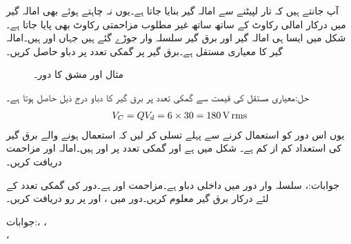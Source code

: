 آپ جانتے ہیں کہ تار لپیٹنے سے امالہ گیر بنایا جاتا ہے۔یوں نہ چاہتے ہوئے بھی امالہ گیر میں درکار امالی رکاوٹ کے ساتھ ساتھ غیر مطلوب مزاحمتی رکاوٹ بھی پایا جاتا ہے۔شکل  میں ایسا ہی امالہ گیر اور برق گیر سلسلہ وار جوڑے گئے ہیں جہاں  اور  ہیں۔امالہ گیر کا معیاری مستقل  ہے۔برق گیر پر گمکی تعدد پر دباو حاصل کریں۔
\begin{figure}
\centering
{}
\caption{مثال  اور مشق  کا دور۔}
\label{شکل_تعددی_امالہ_معیاری_مستقل}
\end{figure}

حل:معیاری مستقل کی قیمت سے گمکی تعدد پر برق گیر کا دباو درج ذیل حاصل ہوتا ہے۔
\begin{align*}
V_C=Q V_d=6\times 30=\SI{180}{\volt}\,{\textup{rms}}
\end{align*}
یوں اس دور کو استعمال کرنے سے پہلے تسلی کر لیں کہ استعمال ہونے والے برق گیر کی استعداد کم از کم  ہے۔
شکل  میں  ہے اور گمکی تعدد پر  اور  ہیں۔امالہ اور مزاحمت دریافت کریں۔

جوابات:، 
سلسلہ وار  دور میں داخلی دباو  ہے۔مزاحمت  اور  ہے۔دور کی گمکی تعدد  کے لئے درکار برق گیر معلوم کریں۔دور میں ،  اور  پر رو دریافت کریں۔

جوابات:، ، \\
، 

